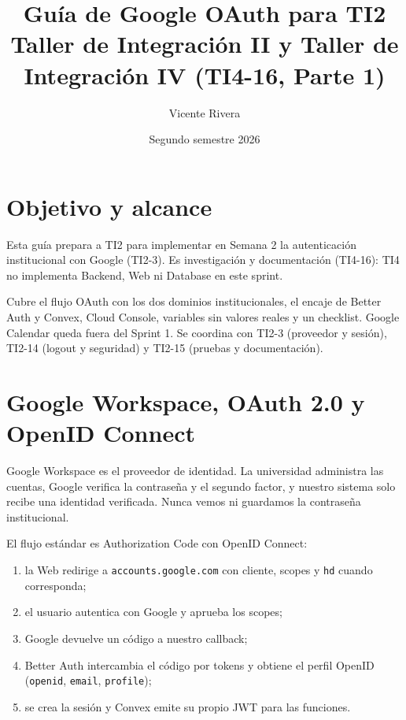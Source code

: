 \documentclass[11pt,a4paper]{article}
\title{
  \textbf{Guía de Google OAuth para TI2}\\
  \large Taller de Integración II y Taller de Integración IV (TI4-16, Parte 1)
}
\author{Vicente Rivera}
\date{Segundo semestre 2026}
\begin{document}
\maketitle

\section{Objetivo y alcance}

Esta guía prepara a TI2 para implementar en Semana 2 la autenticación
institucional con Google (TI2-3). Es investigación y documentación (TI4-16):
TI4 no implementa Backend, Web ni Database en este sprint.

Cubre el flujo OAuth con los dos dominios institucionales, el encaje de
Better Auth y Convex, Cloud Console, variables sin valores reales y un
checklist. Google Calendar queda fuera del Sprint 1. Se coordina con TI2-3
(proveedor y sesión), TI2-14 (logout y seguridad) y TI2-15 (pruebas y
documentación).

\section{Google Workspace, OAuth 2.0 y OpenID Connect}

Google Workspace es el proveedor de identidad. La universidad administra las
cuentas, Google verifica la contraseña y el segundo factor, y nuestro sistema
solo recibe una identidad verificada. Nunca vemos ni guardamos la contraseña
institucional.

El flujo estándar es Authorization Code con OpenID Connect:

\begin{enumerate}
  \item la Web redirige a \texttt{accounts.google.com} con cliente, scopes y
    \texttt{hd} cuando corresponda;
  \item el usuario autentica con Google y aprueba los scopes;
  \item Google devuelve un código a nuestro callback;
  \item Better Auth intercambia el código por tokens y obtiene el perfil
    OpenID (\texttt{openid}, \texttt{email}, \texttt{profile});
  \item se crea la sesión y Convex emite su propio JWT para las funciones.
\end{enumerate}
\end{document}
